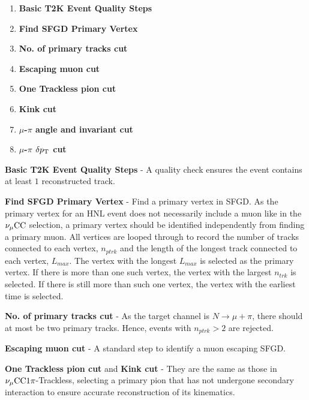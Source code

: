         \begin{enumerate}
            \item \textbf{Basic T2K Event Quality Steps} 
            \item \textbf{Find SFGD Primary Vertex} 
            \item \textbf{No. of primary tracks cut} 
            \item \textbf{Escaping muon cut} 
            \item \textbf{One Trackless pion cut}
            \item \textbf{Kink cut}
            \item \textbf{$\mu$-$\pi$ angle and invariant cut}
            \item \textbf{$\mu$-$\pi$ $\delta p_\textrm{T}$ cut}
        \end{enumerate}

        \textbf{Basic T2K Event Quality Steps} - A quality check ensures the event contains at least $1$ reconstructed track.

        \textbf{Find SFGD Primary Vertex} - Find a primary vertex in SFGD. 
        As the primary vertex for an HNL event does not necessarily include a muon like in the $\nu_{\mu}\textrm{CC}$ selection, a primary vertex should be identified independently from finding a primary muon. 
        All vertices are looped through to record the number of tracks connected to each vertex, $n_{ptrk}$ and the length of the longest track connected to each vertex, $L_{max}$. 
        The vertex with the longest $L_{max}$ is selected as the primary vertex. 
        If there is more than one such vertex, the vertex with the largest $n_{trk}$ is selected. 
        If there is still more than such one vertex, the vertex with the earliest time is selected.

        \textbf{No. of primary tracks cut} - As the target channel is $N\rightarrow\mu+\pi$, there should at most be two primary tracks. Hence, events with $n_{ptrk}>2$ are rejected.

        \textbf{Escaping muon cut} - A standard step to identify a muon escaping SFGD.

        \textbf{One Trackless pion cut} and \textbf{Kink cut} - They are the same as those in $\nu_{\mu}\textrm{CC}1\pi$-Trackless, selecting a primary pion that has not undergone secondary interaction to ensure accurate reconstruction of its kinematics.

